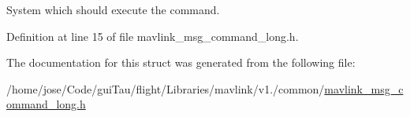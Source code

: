 System which should execute the command. 



Definition at line 15 of file mavlink\-\_\-msg\-\_\-command\-\_\-long.\-h.



The documentation for this struct was generated from the following file\-:\begin{DoxyCompactItemize}
\item 
/home/jose/\-Code/gui\-Tau/flight/\-Libraries/mavlink/v1./common/\hyperlink{mavlink__msg__command__long_8h}{mavlink\-\_\-msg\-\_\-command\-\_\-long.\-h}\end{DoxyCompactItemize}
